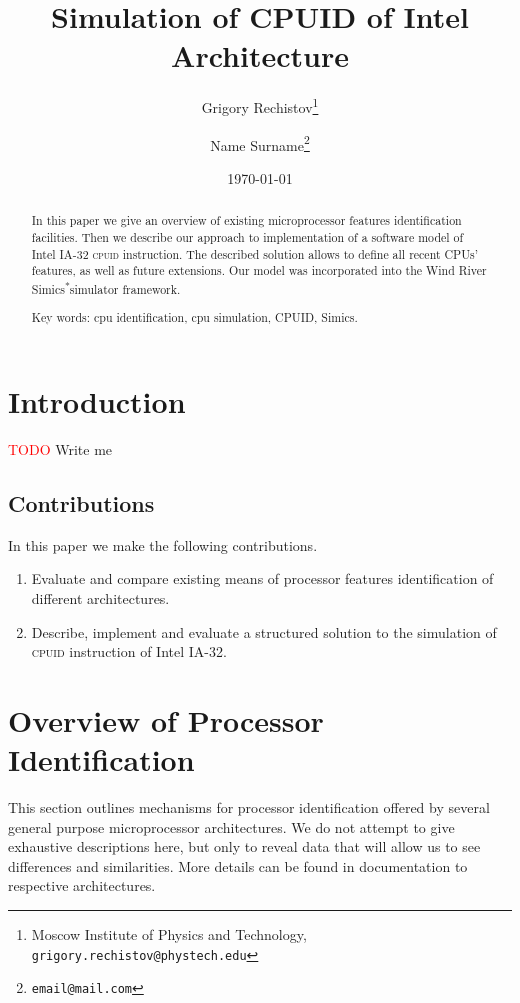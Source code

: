 \documentclass[a4paper,10pt,oneside,unicode]{article}
\author{Grigory Rechistov\thanks{Moscow Institute of Physics and Technology, \texttt{grigory.rechistov@phystech.edu}} \and Name Surname\thanks{\texttt{email@mail.com}}}
\title{Simulation of CPUID of Intel Architecture}
\date{\today}
\newcommand{\cpuid}{\textsc{cpuid} }
\newcommand{\todo}[1][]{\textcolor{red}{TODO #1}}
\newcommand{\othercopyright}{\textsuperscript{*}}
\begin{document}
\maketitle

\tableofcontents

\begin{abstract}
    
   \noindent In this paper we give an overview of existing microprocessor features identification facilities. Then we describe our approach to implementation of a software model of Intel IA-32 \cpuid instruction. The described solution allows to define all recent {CPUs}' features, as well as future extensions. Our model was incorporated into the Wind River Simics\othercopyright simulator framework.
    
    \noindent Key words: cpu identification, cpu simulation, CPUID, Simics.
\end{abstract}

\section {Introduction}

\todo{Write me}

\subsection{Contributions}

In this paper we make the following contributions.
\begin{enumerate}
\item Evaluate and compare existing means of processor features identification of different architectures.
\item Describe, implement and evaluate a structured solution to the simulation of \cpuid instruction of Intel IA-32.
\end{enumerate}

\section{Overview of Processor Identification}

This section outlines mechanisms for processor identification offered by several general purpose microprocessor architectures. We do not attempt to give exhaustive descriptions here, but only to reveal data that will allow us to see differences and similarities. More details can be found in documentation to respective architectures.
\end{document}
